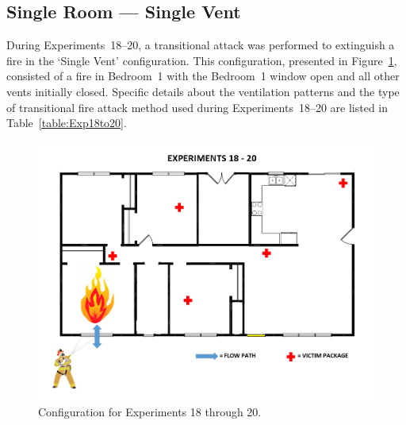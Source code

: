 \documentclass[12pt,oneside]{book}
\begin{document}
\subsection{Single Room --- Single Vent}
During Experiments~18--20, a transitional attack was performed to extinguish a fire in the `Single Vent' configuration. This configuration, presented in Figure~\ref{fig:Single_Vent_ext}, consisted of a fire in Bedroom~1 with the Bedroom~1 window open and all other vents initially closed. Specific details about the ventilation patterns and the type of transitional fire attack method used during Experiments~18--20 are listed in Table~\ref{table:Exp18to20}. 

\begin{figure}[H]
	\centering
	\includegraphics[width=5in]{Figures/General/Exps18through20.png}
	\caption{Configuration for Experiments 18 through 20.}
	\label{fig:Single_Vent_ext}
\end{figure}

\begin{table}[H]
\caption{Experiments 18 through 20}
\centering
{}
\label{table:Exp18to20}
\end{table}
\end{document}
